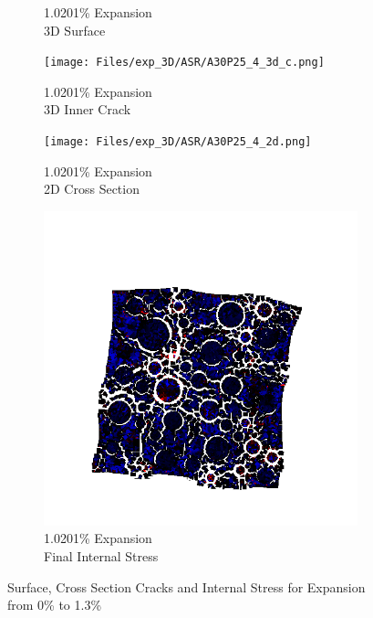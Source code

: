 \begin{figure}[ht!]
\begin{subfigure}{.25\textwidth}
      \caption{1.0201\% Expansion\\3D Surface}
    \end{subfigure}%
    \begin{subfigure}{.25\textwidth}
      \centering
      \texttt{[image: Files/exp\_3D/ASR/A30P25\_4\_3d\_c.png]}
      \caption{1.0201\% Expansion\\3D Inner Crack}
    \end{subfigure}%
    \begin{subfigure}{.25\textwidth}
      \centering
      \texttt{[image: Files/exp\_3D/ASR/A30P25\_4\_2d.png]}
      \caption{1.0201\% Expansion\\2D Cross Section}
    \end{subfigure}%
    \begin{subfigure}{.25\textwidth}
      \centering
      \includegraphics[width=.8\linewidth]{Files/exp_3D/ASR/A30P25_4_stress.png}
      \caption{1.0201\% Expansion\\Final Internal Stress}
    \end{subfigure}

\caption{Surface, Cross Section Cracks and Internal Stress for Expansion from 0\% to 1.3\%}
\label{fig:A30P25_3D_exp}
\end{figure}

